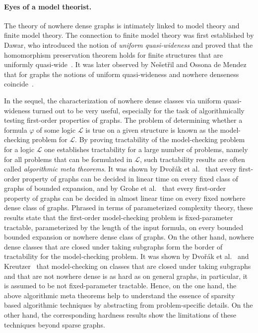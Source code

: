\paragraph*{Eyes of a model theorist.}
The theory of nowhere dense graphs is intimately linked to model
theory and finite model theory. The connection to finite model
theory was first established by Dawar, who introduced the notion
of \emph{uniform quasi-wideness} and proved that the homomorphism
preservation theorem holds for finite structures that are uniformly
quasi-wide~\cite{dawar2010homomorphism}. It was later
observed by Ne\v{s}et\v{r}il and Ossona de Mendez that for graphs
the notions of uniform quasi-wideness and nowhere denseness
coincide~\cite{nevsetvril2010first}. 

In the sequel, the characterization of nowhere dense classes via
uniform quasi-wideness turned out to be very useful, especially 
for the task of algorithmically testing first-order properties of
graphs. The problem of determining whether a formula $\varphi$
of some logic $\mathcal{L}$ is true on a given structure is known 
as the model-checking problem for $\mathcal{L}$. By proving
tractability of the model-checking problem for a logic $\mathcal{L}$
one establishes tractability for a large number of problems, namely
for all problems that can be formulated in $\mathcal{L}$, such 
tractability results are often called \emph{algorithmic meta 
theorems}. It was shown by Dvo\v{r}\'ak et al.~\cite{DvorakKT13}
that every first-order property of graphs can be decided in linear time
on every fixed class of graphs of bounded expansion, and by Grohe et 
al.~\cite{grohe2017deciding} that every first-order property of 
graphs can be decided in almost linear time on every fixed nowhere
dense class of graphs. Phrased in terms of parameterized
complexity theory, these results state that the first-order 
model-checking problem is fixed-parameter tractable, parameterized
by the length of the input formula, on every bounded bounded
expansion or nowhere dense class of graphs. On the other hand, 
nowhere dense classes that are closed under taking subgraphs 
form the border of tractability for the model-checking problem. 
It was shown by Dvo\v{r}\'ak et al.~\cite{DvorakKT13} and
Kreutzer~\cite{kre11} that model-checking on classes that
are closed under taking subgraphs and that are not nowhere
dense is as hard as on general graphs, in particular, it is 
assumed to be not fixed-parameter tractable. 
Hence, on the one hand, the above algorithmic meta theorems 
help to understand the essence of sparsity
based algorithmic techniques by abstracting from problem-specific
details. On the other hand, the corresponding hardness results show 
the limitations of these techniques beyond sparse graphs. 

